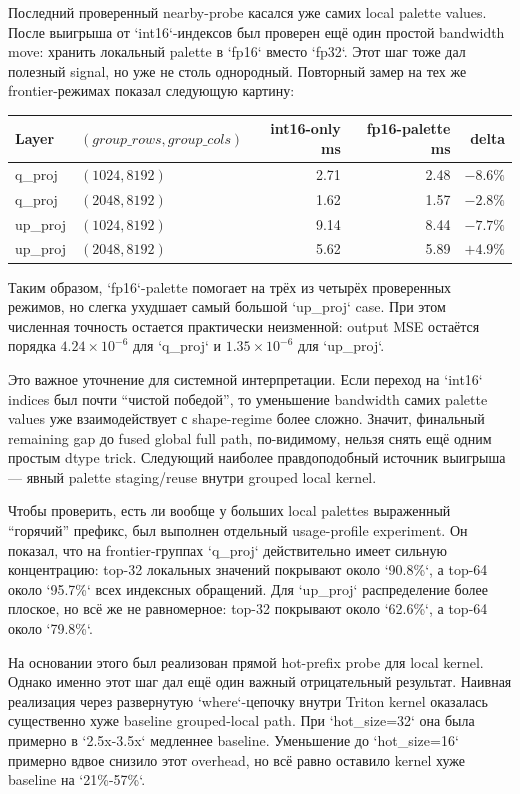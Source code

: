 Последний проверенный nearby-probe касался уже самих local palette values.
После выигрыша от `int16`-индексов был проверен ещё один простой bandwidth move:
хранить локальный palette в `fp16` вместо `fp32`. Этот шаг тоже дал полезный
signal, но уже не столь однородный. Повторный замер на тех же frontier-режимах
показал следующую картину:

\begin{center}
\begin{tabular}{llrrr}
\toprule
Layer & $(group\_rows, group\_cols)$ & int16-only ms & fp16-palette ms & delta \\
\midrule
q\_proj & $(1024, 8192)$ & 2.71 & 2.48 & $-8.6\%$ \\
q\_proj & $(2048, 8192)$ & 1.62 & 1.57 & $-2.8\%$ \\
up\_proj & $(1024, 8192)$ & 9.14 & 8.44 & $-7.7\%$ \\
up\_proj & $(2048, 8192)$ & 5.62 & 5.89 & $+4.9\%$ \\
\bottomrule
\end{tabular}
\end{center}

Таким образом, `fp16`-palette помогает на трёх из четырёх проверенных режимов,
но слегка ухудшает самый большой `up\_proj` case. При этом численная точность
остается практически неизменной: output MSE остаётся порядка
$4.24 \times 10^{-6}$ для `q_proj` и $1.35 \times 10^{-6}$ для `up_proj`.

Это важное уточнение для системной интерпретации. Если переход на `int16`
indices был почти ``чистой победой'', то уменьшение bandwidth самих palette
values уже взаимодействует с shape-regime более сложно. Значит, финальный
remaining gap до fused global full path, по-видимому, нельзя снять ещё одним
простым dtype trick. Следующий наиболее правдоподобный источник выигрыша ---
явный palette staging/reuse внутри grouped local kernel.

Чтобы проверить, есть ли вообще у больших local palettes выраженный ``горячий''
префикс, был выполнен отдельный usage-profile experiment. Он показал, что на
frontier-группах `q_proj` действительно имеет сильную концентрацию: top-32
локальных значений покрывают около `90.8\%`, а top-64 около `95.7\%` всех
индексных обращений. Для `up_proj` распределение более плоское, но всё же
не равномерное: top-32 покрывают около `62.6\%`, а top-64 около `79.8\%`.

На основании этого был реализован прямой hot-prefix probe для local kernel.
Однако именно этот шаг дал ещё один важный отрицательный результат. Наивная
реализация через развернутую `where`-цепочку внутри Triton kernel оказалась
существенно хуже baseline grouped-local path. При `hot\_size=32` она была
примерно в `2.5x-3.5x` медленнее baseline. Уменьшение до `hot\_size=16`
примерно вдвое снизило этот overhead, но всё равно оставило kernel хуже
baseline на `21\%-57\%`.


